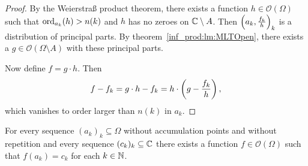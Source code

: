 \begin{proof}
By the Weierstraß product theorem, there exists a function
$h \in \mathcal{O}(\Omega)$ such that $\operatorname{ord}_{a_k}(h) > n(k)$ and
$h$ has no zeroes on $\mathbb{C} \setminus A$. Then
$\left(a_k, \frac{f_k}{h}\right)_k$ is a distribution of principal parts.
By theorem~\ref{inf_prod:lm:MLTOpen}, there exists a
$g \in \mathcal{O}(\Omega \setminus A)$ with these principal parts.

Now define $f = g \cdot h$. Then
\[
f - f_k = g \cdot h - f_k = h \cdot \left(g - \frac{f_k}{h}\right),
\]
which vanishes to order larger than $n(k)$ in $a_k$.
\end{proof}

\begin{posledica}
For every sequence $(a_k)_k \subseteq \Omega$ without accumulation
points and without repetition and every sequence
$(c_k)_k \subseteq \mathbb{C}$ there exists a function
$f \in \mathcal{O}(\Omega)$ such that $f(a_k) = c_k$ for each
$k \in \mathbb{N}$.
\end{posledica}
